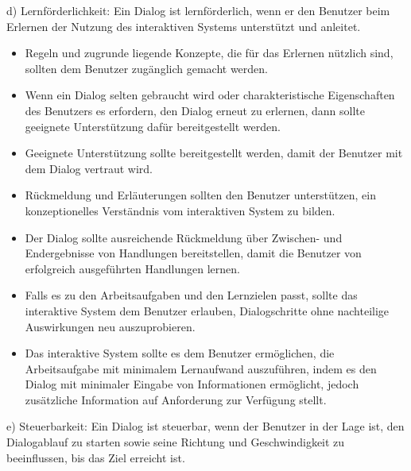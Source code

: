 d) Lernförderlichkeit:\newline
Ein Dialog ist lernförderlich, wenn er den Benutzer beim Erlernen der Nutzung des interaktiven Systems
unterstützt und anleitet.
\begin{itemize}
	\item Regeln und zugrunde liegende Konzepte, die für das Erlernen nützlich sind, sollten dem Benutzer
	zugänglich gemacht werden.
	\item Wenn ein Dialog selten gebraucht wird oder charakteristische Eigenschaften des Benutzers es
	erfordern, den Dialog erneut zu erlernen, dann sollte geeignete Unterstützung dafür bereitgestellt werden.
	\item Geeignete Unterstützung sollte bereitgestellt werden, damit der Benutzer mit dem Dialog vertraut wird.
	\item Rückmeldung und Erläuterungen sollten den Benutzer unterstützen, ein konzeptionelles Verständnis
	vom interaktiven System zu bilden.
	\item Der Dialog sollte ausreichende Rückmeldung über Zwischen- und Endergebnisse von Handlungen
	bereitstellen, damit die Benutzer von erfolgreich ausgeführten Handlungen lernen.
	\item Falls es zu den Arbeitsaufgaben und den Lernzielen passt, sollte das interaktive System dem
	Benutzer erlauben, Dialogschritte ohne nachteilige Auswirkungen neu auszuprobieren.
	\item Das interaktive System sollte es dem Benutzer ermöglichen, die Arbeitsaufgabe mit minimalem
	Lernaufwand auszuführen, indem es den Dialog mit minimaler Eingabe von Informationen ermöglicht, jedoch
	zusätzliche Information auf Anforderung zur Verfügung stellt.
\end{itemize}
e) Steuerbarkeit:\newline
Ein Dialog ist steuerbar, wenn der Benutzer in der Lage ist, den Dialogablauf zu starten sowie seine Richtung
und Geschwindigkeit zu beeinflussen, bis das Ziel erreicht ist.
